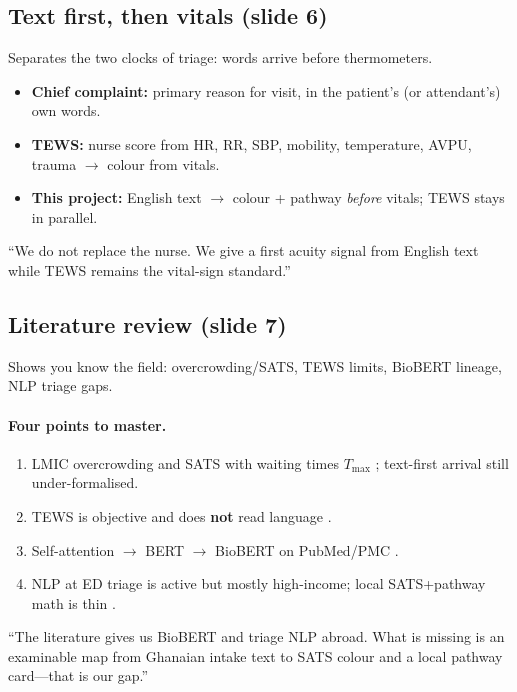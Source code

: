 \subsection{Text first, then vitals (slide 6)}

\begin{whybox}
Separates the two clocks of triage: words arrive before thermometers.
\end{whybox}

\begin{itemize}
  \item \textbf{Chief complaint:} primary reason for visit, in the patient's (or attendant's) own words.
  \item \textbf{TEWS:} nurse score from HR, RR, SBP, mobility, temperature, AVPU, trauma \(\to\) colour from vitals.
  \item \textbf{This project:} English text \(\to\) colour + pathway \emph{before} vitals; TEWS stays in parallel.
\end{itemize}

\begin{saybox}
``We do not replace the nurse. We give a first acuity signal from English text while TEWS remains the vital-sign standard.''
\end{saybox}

\subsection{Literature review (slide 7)}

\begin{whybox}
Shows you know the field: overcrowding/SATS, TEWS limits, BioBERT lineage, NLP triage gaps.
\end{whybox}

\paragraph{Four points to master.}
\begin{enumerate}
  \item LMIC overcrowding and SATS with waiting times \(T_{\max}\) \citep{kathsats,satsmanual}; text-first arrival still under-formalised.
  \item TEWS is objective and does \textbf{not} read language \citep{satsmanual}.
  \item Self-attention \(\to\) BERT \(\to\) BioBERT on PubMed/PMC \citep{vaswani2017attention,lee2020biobert}.
  \item NLP at ED triage is active but mostly high-income; local SATS+pathway math is thin \citep{stewart2023nlp,gligorijevic2018deep}.
\end{enumerate}

\begin{saybox}
``The literature gives us BioBERT and triage NLP abroad. What is missing is an examinable map from Ghanaian intake text to SATS colour and a local pathway card---that is our gap.''
\end{saybox}
